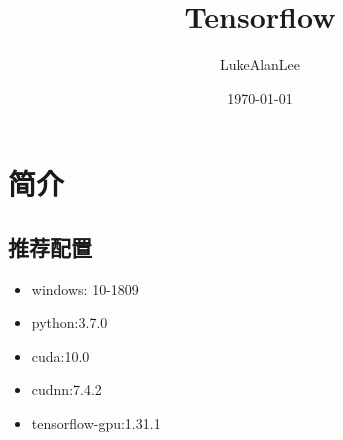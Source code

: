 \documentclass[UTF8]{article}%
\title{\heiti Tensorflow}
\author{\kaishu LukeAlanLee}
\date{\today}
\begin{document}
	\tableofcontents
	\maketitle
	
	\section{简介}
		\subsection{推荐配置}
			\begin{itemize}
				\item windows: 10-1809
				\item python:3.7.0
				\item cuda:10.0
				\item cudnn:7.4.2
				\item tensorflow-gpu:1.31.1
			\end{itemize}
\end{document}
